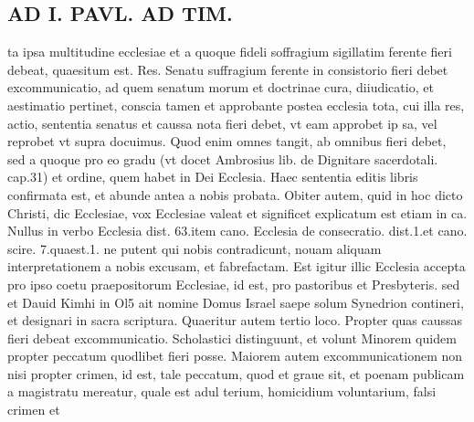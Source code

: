 \documentclass{article}
\begin{document}
\begin{pages}
\section*{AD I. PAVL. AD TIM. }
\marginpar{[ p.334 ]}\pstart ta ipsa multitudine ecclesiae et a quoque fideli soffragium sigillatim ferente fieri debeat, quaesitum est. Res. Senatu suffragium ferente in consistorio fieri debet excommunicatio, ad quem senatum morum et doctrinae cura, diiudicatio, et aestimatio pertinet, conscia tamen et approbante postea ecclesia tota, cui illa res, actio, sententia senatus et caussa nota fieri debet, vt eam approbet ip sa, vel reprobet vt supra docuimus. Quod enim omnes tangit, ab omnibus fieri debet, sed a quoque pro eo gradu (vt docet Ambrosius lib.  de Dignitare sacerdotali. cap.31) et ordine, quem habet in Dei Ecclesia. Haec sententia editis libris confirmata est, et abunde antea a nobis probata. Obiter autem, quid in hoc dicto Christi, dic Ecclesiae, vox Ecclesiae valeat et significet explicatum est etiam in ca. Nullus in verbo Ecclesia dist. 63.item cano. Ecclesia de consecratio. dist.1.et cano. scire. 7.quaest.1. ne putent qui nobis contradicunt, nouam aliquam interpretationem a nobis excusam, et fabrefactam. Est igitur illic Ecclesia accepta pro ipso coetu praepositorum Ecclesiae, id est, pro pastoribus et Presbyteris. sed et Dauid Kimhi in Ol5 ait nomine Domus Israel saepe solum Synedrion contineri, et designari in sacra scriptura. Quaeritur autem tertio loco. Propter quas caussas fieri debeat excommunicatio. Scholastici distinguunt, et volunt Minorem quidem propter peccatum quodlibet fieri posse. Maiorem autem excommunicationem non nisi propter crimen, id est, tale peccatum, quod et graue sit, et poenam publicam a magistratu mereatur, quale est adul terium, homicidium voluntarium, falsi crimen et  \pend

\end{pages}
\end{document}
